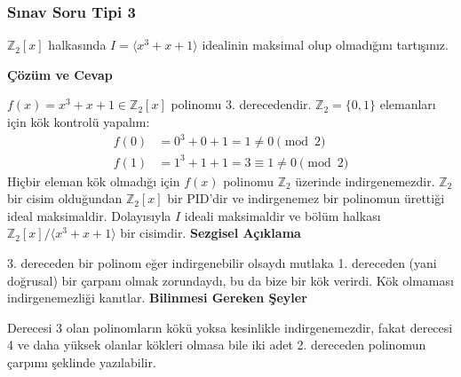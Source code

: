 \documentclass[11pt, a4paper]{article}
\newenvironment{cozum}{
    \vspace{0.5cm}
    \noindent\textcolor{green!60!black}{\faCheckCircle\enspace \textbf{\Large Çözüm ve Cevap}}\par\vspace{0.2cm}
}{}
\newenvironment{sezgisel}{
    \vspace{0.5cm}
    \noindent\textcolor{orange!80!black}{\faLightbulb\enspace \textbf{\Large Sezgisel Açıklama}}\par\vspace{0.2cm}
    \itshape
}{}
\newenvironment{bilgi}{
    \vspace{0.5cm}
    \noindent\textcolor{red!70!black}{\faExclamationTriangle\enspace \textbf{\Large Bilinmesi Gereken Şeyler}}\par\vspace{0.2cm}
}{}
\begin{document}
\subsubsection{Sınav Soru Tipi 3}
\begin{sinavbox}
$\mathbb{Z}_{2}[x]$ halkasında $I = \langle x^3+x+1 \rangle$ idealinin maksimal olup olmadığını tartışınız.
\end{sinavbox}
\begin{cozum}
$f(x) = x^3+x+1 \in \mathbb{Z}_2[x]$ polinomu 3. derecedendir. $\mathbb{Z}_2 = \{0, 1\}$ elemanları için kök kontrolü yapalım:
\begin{align*}
f(0) &= 0^3+0+1 = 1 \neq 0 \pmod 2 \\
f(1) &= 1^3+1+1 = 3 \equiv 1 \neq 0 \pmod 2
\end{align*}
Hiçbir eleman kök olmadığı için $f(x)$ polinomu $\mathbb{Z}_2$ üzerinde indirgenemezdir. $\mathbb{Z}_2$ bir cisim olduğundan $\mathbb{Z}_2[x]$ bir PID'dir ve indirgenemez bir polinomun ürettiği ideal maksimaldir. Dolayısıyla $I$ ideali maksimaldir ve bölüm halkası $\mathbb{Z}_2[x] / \langle x^3+x+1 \rangle$ bir cisimdir.
\end{cozum}
\begin{sezgisel}
3. dereceden bir polinom eğer indirgenebilir olsaydı mutlaka 1. dereceden (yani doğrusal) bir çarpanı olmak zorundaydı, bu da bize bir kök verirdi. Kök olmaması indirgenemezliği kanıtlar.
\end{sezgisel}
\begin{bilgi}
Derecesi 3 olan polinomların kökü yoksa kesinlikle indirgenemezdir, fakat derecesi 4 ve daha yüksek olanlar kökleri olmasa bile iki adet 2. dereceden polinomun çarpımı şeklinde yazılabilir.
\end{bilgi}

\newpage
\end{document}
